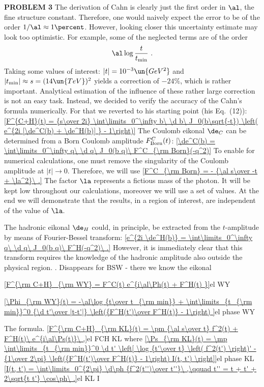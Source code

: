 \iffalse
{\bf PROBLEM 3}
The derivation of Cahn  is clearly just the first order in $\al$, the fine structure constant. Therefore, one would naively expect the error to be of the order $1/\al\approx 1\percent$. However, looking closer this uncertainty estimate may look too optimistic. For example, some of the neglected terms are of the order
$$\al \log {t\over t_{\rm min}}\ .$$
Taking some values of interest: $|t| = 10^{-3}\un{GeV^2}$ and $|t_{\rm min}| \approx s = (14\un{TeV})^2$ yields a correction of $-24\percent$, which is rather important. Analytical estimation of the influence of these rather large correction is not an easy task. Instead, we decided to verify the accuracy of the Cahn's formula numerically. For that we reverted to his starting point (his Eq.~(12)):
\eqref{F^{C+H}(t) = {s\over 2i} \int\limits_0^\infty b\ \d b\ J_0(b\sqrt{-t}) \left( e^{2i [\de^C(b) + \de^H(b)] } - 1\right)}{}
The Coulomb eikonal $\de_C$ can be determined from a Born Coulomb amplitude $F^C_{\rm Born}(t)$:
\eqref{\de^C(b) = \int\limits_0^\infty q\ \d q\ J_0(b q)\ F^C_{\rm Born}(-q^2)}{}
To enable for numerical calculations, one must remove the singularity of the Coulomb amplitude at $|t|\to 0$. Therefore, we will use
\eqref{F^C_{\rm Born} = - {\al s\over -t + \la^2}\ .}{}
The factor $\la$ represents a fictious mass of the photon. It will be kept low throughout our calculations, moreover we will use a set of values. At the end we will demonstrate that the results, in a region of interest, are independent of the value of $\la$.

The hadronic eikonal $\de_H$ could, in principle, be extracted from the $t$-amplitude by means of Fourier-Bessel transform:
\eqref{e^{2i \de^H(b)} = \int\limits_0^\infty q\ \d q\ J_0(b q)\ F^H(-q^2)\ .}{}
However, it is immediately clear that this transform requires the knowledge of the hadronic amplitude also outside the physical region.
. Disappears for BSW - there we know the eikonal


\eqref{F^{\rm C+H}_{\rm WY} = F^C(t) e^{i\al\Ph(t) + F^H(t) }}{el WY}

\eqref{\Phi_{\rm WY}(t) =  -\al\log {t\over t_{\rm min}} + \int\limits_{t_{\rm min}}^0 {\d t'\over |t-t'|} \left({F^H(t')\over F^H(t)} - 1\right) }{el phase WY}


The \KL{} formula.
\eqref{F^{\rm C+H}_{\rm KL}(t) = \pm {\al s\over t} f^2(t) + F^H(t)\ e^{i\al\Ps(t)}\ ,}{el FCH KL}
where
\eqref{\Ps_{\rm KL}(t) = \mp \int\limits_{t_{\rm min}}^0 \d t' \left[ \log {t'\over t} \left( f^2(t') \right)' - {1\over 2\pi} \left({F^H(t')\over F^H(t)} - 1\right) I(t, t') \right]}{el phase KL}
\eqref{I(t, t') = \int\limits_0^{2\pi} \d\ph {f^2(t'')\over t''}\ ,\qquad t'' = t + t' + 2\sqrt{t t'} \cos\ph\ .}{el KL I}

